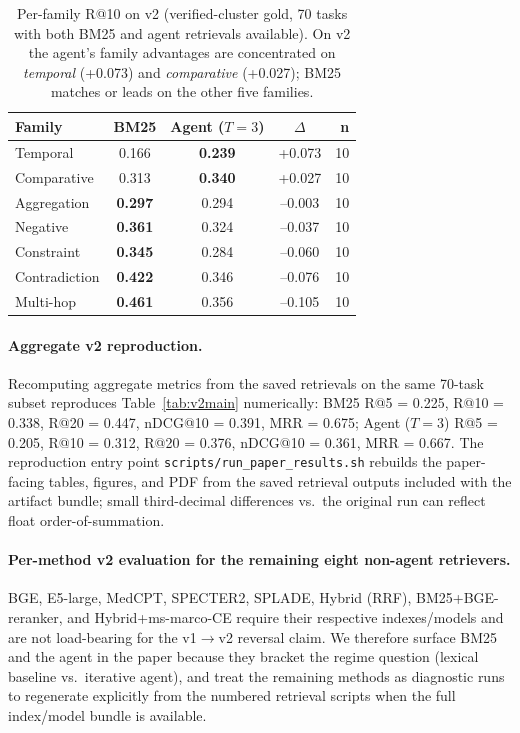 \documentclass{article}
\begin{document}
\begin{table}[ht]
\centering
\caption{Per-family R@10 on v2 (verified-cluster gold, 70 tasks with both BM25 and agent retrievals available). On v2 the agent's family advantages are concentrated on \emph{temporal} (+0.073) and \emph{comparative} (+0.027); BM25 matches or leads on the other five families.}
\label{tab:v2family}
\small
\begin{tabular}{lcccr}
\toprule
\textbf{Family} & \textbf{BM25} & \textbf{Agent ($T{=}3$)} & \textbf{$\Delta$} & \textbf{n} \\
\midrule
Temporal       & 0.166 & \textbf{0.239} & +0.073 & 10 \\
Comparative    & 0.313 & \textbf{0.340} & +0.027 & 10 \\
Aggregation    & \textbf{0.297} & 0.294 & --0.003 & 10 \\
Negative       & \textbf{0.361} & 0.324 & --0.037 & 10 \\
Constraint     & \textbf{0.345} & 0.284 & --0.060 & 10 \\
Contradiction  & \textbf{0.422} & 0.346 & --0.076 & 10 \\
Multi-hop      & \textbf{0.461} & 0.356 & --0.105 & 10 \\
\bottomrule
\end{tabular}
\end{table}

\paragraph{Aggregate v2 reproduction.} Recomputing aggregate metrics from the saved retrievals on the same 70-task subset reproduces Table~\ref{tab:v2main} numerically: BM25 R@5 = 0.225, R@10 = 0.338, R@20 = 0.447, nDCG@10 = 0.391, MRR = 0.675; Agent ($T{=}3$) R@5 = 0.205, R@10 = 0.312, R@20 = 0.376, nDCG@10 = 0.361, MRR = 0.667. The reproduction entry point \texttt{scripts/run\_paper\_results.sh} rebuilds the paper-facing tables, figures, and PDF from the saved retrieval outputs included with the artifact bundle; small third-decimal differences vs.\ the original run can reflect float order-of-summation.

\paragraph{Per-method v2 evaluation for the remaining eight non-agent retrievers.} BGE, E5-large, MedCPT, SPECTER2, SPLADE, Hybrid (RRF), BM25+BGE-reranker, and Hybrid+ms-marco-CE require their respective indexes/models and are not load-bearing for the v1$\to$v2 reversal claim. We therefore surface BM25 and the agent in the paper because they bracket the regime question (lexical baseline vs.\ iterative agent), and treat the remaining methods as diagnostic runs to regenerate explicitly from the numbered retrieval scripts when the full index/model bundle is available.
\end{document}
